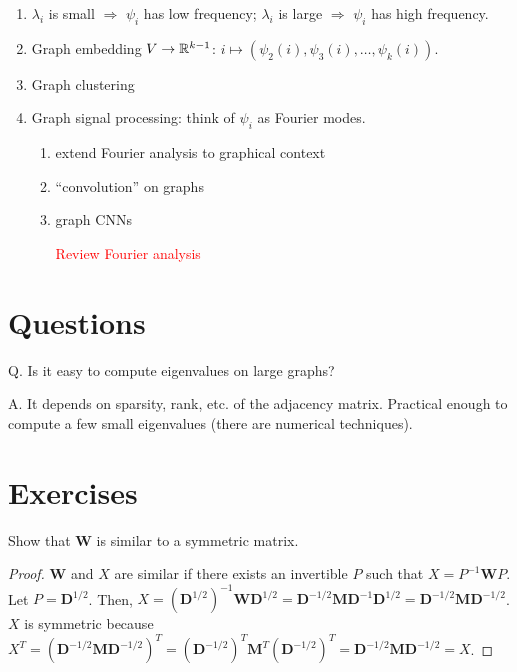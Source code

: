 \documentclass[11pt,letterpaper]{article}
\begin{document}
\begin{enumerate}[label=(\alph*)]
  \item $\lambda_i$ is small $\Longrightarrow$ $\psi_i$ has low frequency;
  $\lambda_i$ is large $\Longrightarrow$ $\psi_i$ has high frequency.

  \item Graph embedding $V \to \mathbb{R}^{k-1}$: $i \mapsto (\psi_2(i), \psi_3(i), \ldots, \psi_k(i))$.
  \item Graph clustering
  \item Graph signal processing: think of $\psi_i$ as Fourier modes.
  \begin{enumerate}[label=(\arabic*)]
    \item extend Fourier analysis to graphical context
    \item ``convolution'' on graphs
    \item graph CNNs
    
    \textcolor{red}{Review Fourier analysis}
  \end{enumerate}

\end{enumerate}

\section{Questions}

Q. Is it easy to compute eigenvalues on large graphs?

A. It depends on sparsity, rank, etc. of the adjacency matrix.
%
Practical enough to compute a few small eigenvalues (there are numerical techniques).

\section{Exercises}

\begin{exercise} Show that $\bm{W}$ is similar to a symmetric matrix.
\end{exercise}

\begin{proof}
  $\bm{W}$ and $X$ are similar if there exists an invertible $P$ such that $X=P^{-1} \bm{W} P$.
  Let $P=\bm{D}^{1/2}$. Then,
  $X=(\bm{D}^{1/2})^{-1} \bm{W} \bm{D}^{1/2}
   = \bm{D}^{-1/2} \bm{M} \bm{D}^{-1} \bm{D}^{1/2}
   = \bm{D}^{-1/2} \bm{M} \bm{D}^{-1/2}$.
  $X$ is symmetric because $X^T
  = \left(\bm{D}^{-1/2} \bm{M} \bm{D}^{-1/2}\right)^T
  = \left(\bm{D}^{-1/2}\right)^T \bm{M}^T \left(\bm{D}^{-1/2}\right)^T
  = \bm{D}^{-1/2} \bm{M} \bm{D}^{-1/2} = X$.
\end{proof}
\end{document}
